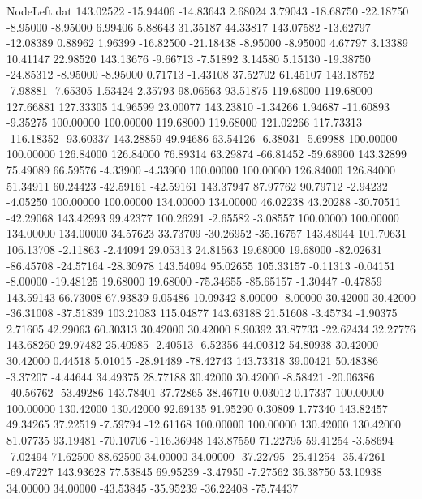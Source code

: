 \begin{filecontents}{NodeLeft.dat}
 143.02522  -15.94406  -14.83643     2.68024    3.79043  -18.68750  -22.18750   -8.95000   -8.95000    6.99406    5.88643   31.35187   44.33817
 143.07582  -13.62797  -12.08389     0.88962    1.96399  -16.82500  -21.18438   -8.95000   -8.95000    4.67797    3.13389   10.41147   22.98520
 143.13676   -9.66713   -7.51892     3.14580    5.15130  -19.38750  -24.85312   -8.95000   -8.95000    0.71713   -1.43108   37.52702   61.45107
 143.18752   -7.98881   -7.65305     1.53424    2.35793   98.06563   93.51875  119.68000  119.68000  127.66881  127.33305   14.96599   23.00077
 143.23810   -1.34266    1.94687   -11.60893   -9.35275  100.00000  100.00000  119.68000  119.68000  121.02266  117.73313 -116.18352  -93.60337
 143.28859   49.94686   63.54126    -6.38031   -5.69988  100.00000  100.00000  126.84000  126.84000   76.89314   63.29874  -66.81452  -59.68900
 143.32899   75.49089   66.59576    -4.33900   -4.33900  100.00000  100.00000  126.84000  126.84000   51.34911   60.24423  -42.59161  -42.59161
 143.37947   87.97762   90.79712    -2.94232   -4.05250  100.00000  100.00000  134.00000  134.00000   46.02238   43.20288  -30.70511  -42.29068
 143.42993   99.42377  100.26291    -2.65582   -3.08557  100.00000  100.00000  134.00000  134.00000   34.57623   33.73709  -30.26952  -35.16757
 143.48044  101.70631  106.13708    -2.11863   -2.44094   29.05313   24.81563   19.68000   19.68000  -82.02631  -86.45708  -24.57164  -28.30978
 143.54094   95.02655  105.33157    -0.11313   -0.04151   -8.00000  -19.48125   19.68000   19.68000  -75.34655  -85.65157   -1.30447   -0.47859
 143.59143   66.73008   67.93839     9.05486   10.09342    8.00000   -8.00000   30.42000   30.42000  -36.31008  -37.51839  103.21083  115.04877
 143.63188   21.51608   -3.45734    -1.90375    2.71605   42.29063   60.30313   30.42000   30.42000    8.90392   33.87733  -22.62434   32.27776
 143.68260   29.97482   25.40985    -2.40513   -6.52356   44.00312   54.80938   30.42000   30.42000    0.44518    5.01015  -28.91489  -78.42743
 143.73318   39.00421   50.48386    -3.37207   -4.44644   34.49375   28.77188   30.42000   30.42000   -8.58421  -20.06386  -40.56762  -53.49286
 143.78401   37.72865   38.46710     0.03012    0.17337  100.00000  100.00000  130.42000  130.42000   92.69135   91.95290    0.30809    1.77340
 143.82457   49.34265   37.22519    -7.59794  -12.61168  100.00000  100.00000  130.42000  130.42000   81.07735   93.19481  -70.10706 -116.36948
 143.87550   71.22795   59.41254    -3.58694   -7.02494   71.62500   88.62500   34.00000   34.00000  -37.22795  -25.41254  -35.47261  -69.47227
 143.93628   77.53845   69.95239    -3.47950   -7.27562   36.38750   53.10938   34.00000   34.00000  -43.53845  -35.95239  -36.22408  -75.74437

\end{filecontents}
